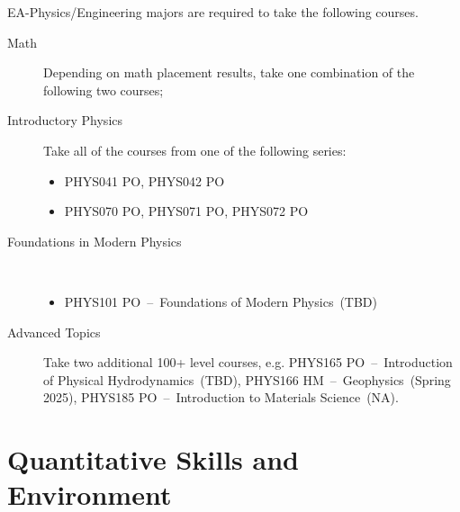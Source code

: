 \documentclass{article}\usepackage[]{graphicx}\usepackage[]{xcolor}
\newenvironment{itemize*}%
  {\begin{itemize}%
    \setlength{\itemsep}{0pt}%
    \setlength{\parskip}{0pt}}%
  {\end{itemize}}
\begin{document}
\noindent EA-Physics/Engineering majors are required to take the following courses.

\begin{description}
  \item[Math] Depending on math placement results, take one combination of the following two courses; 
  

  
  \item[Introductory Physics] Take all of the courses from one of the following series: 
  \begin{itemize}
  \item PHYS041 PO, PHYS042 PO
  \item PHYS070 PO, PHYS071 PO, PHYS072  PO
\end{itemize}
 
  \item[Foundations in Modern Physics]
~~
  \begin{itemize}
  \item PHYS101 PO~--~Foundations of Modern Physics~(TBD)
\end{itemize}


  \item[Advanced Topics] Take two additional 100+ level courses, e.g. PHYS165 PO~--~Introduction of Physical Hydrodynamics~(TBD), PHYS166 HM~--~Geophysics~(Spring 2025), PHYS185 PO~--~Introduction to Materials Science~(NA). 
  
\end{description}



\clearpage
\newpage %
\section{Quantitative Skills and Environment}
\end{document}
